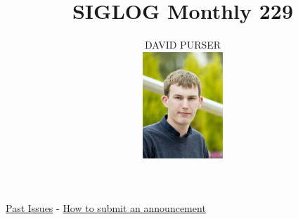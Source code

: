 \documentclass[prodmode,acmtecs]{acmsmall} %
\newcounter{colstart}
\begin{document}
\setcounter{colstart}{\thepage}

\title{\huge\sc SIGLOG Monthly 229}
\author{DAVID PURSER
\vspace*{-2.6cm}\begin{flushright}\includegraphics[width=30mm]{dp}\end{flushright}
}

\maketitlee

\href{https://lics.siglog.org/newsletters/}{Past Issues}
 - 
\href{https://lics.siglog.org/newsletters/inst.html}{How to submit an announcement}
\end{document}
